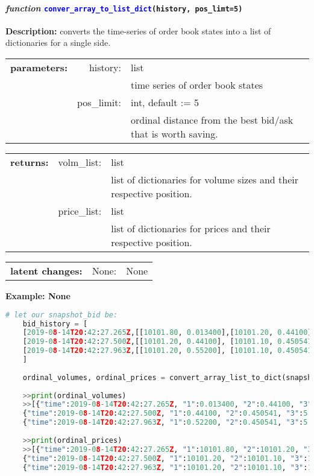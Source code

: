 \paragraph{\textit{function} \textcolor{blue}{\texttt{conver\_array\_to\_list\_dict}}\texttt{(history, pos\_limt=5)}}\hfill\break
\noindent \textbf{Description:} converts the time-series of order book states into a list of dictionaries for a single side.  

\begin{tabular}{r r l }
	\textbf{parameters:}	& history: & list\\
	&  & time series of order book states\\
	& pos\_limit:& int, default := 5\\
	&& ordinal distance from the best bid/ask that is worth saving.	
\end{tabular}

\begin{tabular}{l c l}
	\textbf{returns:} & volm\_list: & list\\
	& & list of dictionaries for volume sizes and their respective position.\\
	& price\_list: & list\\
	&& list of dictionaries for prices and their respective position.
\end{tabular}

\begin{tabular}{l c l}
	\textbf{latent changes:} & None: & None\\
\end{tabular}

\textbf{Example: None}
\begin{lstlisting}[language=Python]
	# let our snapshot_bid be:
	bid_history = [
	[2019-08-14T20:42:27.265Z,[[10101.80, 0.013400],[10101.20, 0.44100], [10101.10, 0.450541], [10100.55, 5.24501], [10099.00, 10.24511], [10090.11, 24.21395]]],
	[2019-08-14T20:42:27.500Z,[[10101.20, 0.44100], [10101.10, 0.450541], [10100.55, 5.24501], [10099.00, 10.24511], [10090.11, 24.21395],[10090.05]] ],
	[2019-08-14T20:42:27.963Z,[[10101.20, 0.55200], [10101.10, 0.450541], [10100.55, 5.24501], [10099.00, 10.24511], [10090.11, 24.21395]]]
	]
		
	ordinal_volumes, ordinal_prices = convert_array_list_to_dict(snapshot)
	
	>>print(ordinal_volumes)
	>>[{"time":2019-08-14T20:42:27.265Z, "1":0.013400, "2":0.44100, "3":0.450541, "4":5.24501, "5":10.24511},
	{"time":2019-08-14T20:42:27.500Z, "1":0.44100, "2":0.450541, "3":5.24501, "4":10.24511, "5":24.21395},
	{"time":2019-08-14T20:42:27.963Z, "1":0.52200, "2":0.450541, "3":5.24501, "4":10.24511, "5":2421395}]
	
	>>print(ordinal_prices)
	>>[{"time":2019-08-14T20:42:27.265Z, "1":10101.80, "2":10101.20, "3":10101.10, "4":10100.55, "5":10099.00},
	{"time":2019-08-14T20:42:27.500Z, "1":10101.20, "2":10101.10, "3":10100.55, "4":10099.00, "5":10090.11},
	{"time":2019-08-14T20:42:27.963Z, "1":10101.20, "2":10101.10, "3":10100.55, "4":10099.00, "5":10090.11}]
\end{lstlisting}